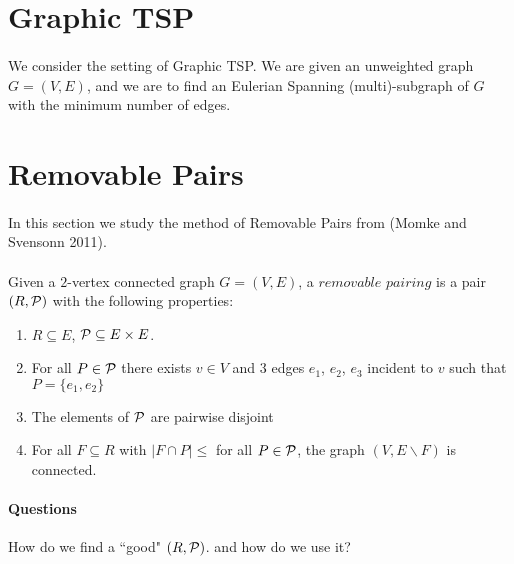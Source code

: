 \documentclass[letterpaper,12pt,oneside,onecolumn]{article}
\begin{document}
\section{Graphic TSP}
\paragraph{} We consider the setting of Graphic TSP. We are given an unweighted graph $G=(V,E)$, and we are to find an Eulerian Spanning (multi)-subgraph of $G$ with the minimum number of edges.
\section{Removable Pairs}
\paragraph{}
In this section we study the method of Removable Pairs from (Momke and Svensonn 2011).
\paragraph{}
Given a $2$-vertex connected graph $G=(V,E)$, a $\textit{removable pairing}$ is a pair $(R, \mathcal{P})$ with the following properties:
\begin{enumerate}[label=(\alph*)]
\item $R \subseteq E$, $\mathcal{P} \subseteq E\times E$.
\item For all $P \in \mathcal{P}$ there exists $v \in V$ and $3$ edges $e_1$, $e_2$, $e_3$ incident to $v$ such that $P = \{e_1, e_2\}$
\item The elements of $\mathcal{P}$ are pairwise disjoint
\item For all $F\subseteq R$ with $|F\cap P| \leq $ for all $P \in \mathcal{P}$, the graph $(V, E\backslash F)$ is connected.
\end{enumerate}
\paragraph{Questions}
How do we find a ``good" $(R,\mathcal{P})$. and how do we use it?
\end{document}
